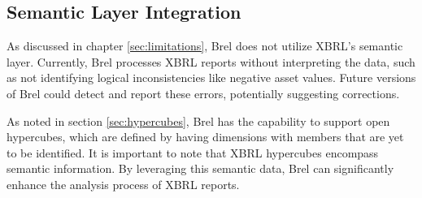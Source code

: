 \subsection{Semantic Layer Integration}

As discussed in chapter \ref{sec:limitations}, Brel does not utilize XBRL's semantic layer.
Currently, Brel processes XBRL reports without interpreting the data, such as not identifying logical inconsistencies like negative asset values.
Future versions of Brel could detect and report these errors, potentially suggesting corrections.

As noted in section \ref{sec:hypercubes}, Brel has the capability to support open hypercubes,
which are defined by having dimensions with members that are yet to be identified.
It is important to note that XBRL hypercubes encompass semantic information\cite{xbrl_dimensions_technical_considerations}.
By leveraging this semantic data, Brel can significantly enhance the analysis process of XBRL reports.



